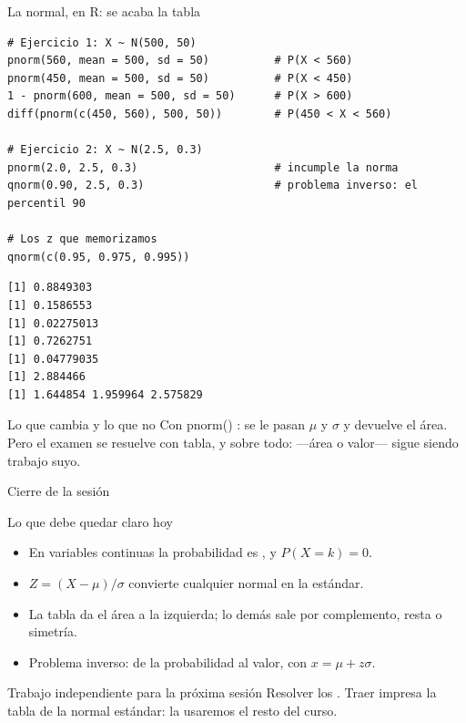 \documentclass[aspectratio=169,10pt]{beamer}
\newcommand{\fx}[1]{{\ttfamily\color{uniAzul}#1}}
\begin{document}
\begin{frame}[fragile]{La normal, en R: se acaba la tabla}
  \scriptsize
\begin{lstlisting}[style=Rmini]
# Ejercicio 1: X ~ N(500, 50)
pnorm(560, mean = 500, sd = 50)          # P(X < 560)
pnorm(450, mean = 500, sd = 50)          # P(X < 450)
1 - pnorm(600, mean = 500, sd = 50)      # P(X > 600)
diff(pnorm(c(450, 560), 500, 50))        # P(450 < X < 560)

# Ejercicio 2: X ~ N(2.5, 0.3)
pnorm(2.0, 2.5, 0.3)                     # incumple la norma
qnorm(0.90, 2.5, 0.3)                    # problema inverso: el percentil 90

# Los z que memorizamos
qnorm(c(0.95, 0.975, 0.995))
\end{lstlisting}
\begin{lstlisting}[style=Rout]
[1] 0.8849303
[1] 0.1586553
[1] 0.02275013
[1] 0.7262751
[1] 0.04779035
[1] 2.884466
[1] 1.644854 1.959964 2.575829
\end{lstlisting}

  \vspace{-0.12cm}
  \begin{alertblock}{Lo que cambia y lo que no}
    \tiny
    Con \fx{pnorm()} : se le pasan
    $\mu$ y $\sigma$ y devuelve el área. Pero el examen se resuelve con tabla,
    y sobre todo: 
    —área o valor— sigue siendo trabajo suyo.
  \end{alertblock}
\end{frame}

\begin{frame}{Cierre de la sesión}
  \begin{block}{Lo que debe quedar claro hoy}
    \begin{itemize}
      \item En variables continuas la probabilidad es , y
            $P(X=k)=0$.
      \item $Z=(X-\mu)/\sigma$ convierte cualquier normal en la estándar.
      \item La tabla da el área a la izquierda; lo demás sale por complemento,
            resta o simetría.
      \item Problema inverso: de la probabilidad al valor, con
            $x=\mu+z\sigma$.
    \end{itemize}
  \end{block}

  \vspace{0.2cm}
  \begin{alertblock}{Trabajo independiente para la próxima sesión}
    \footnotesize
    Resolver los . Traer impresa
    la tabla de la normal estándar: la usaremos el resto del curso.
  \end{alertblock}
\end{frame}
\end{document}
